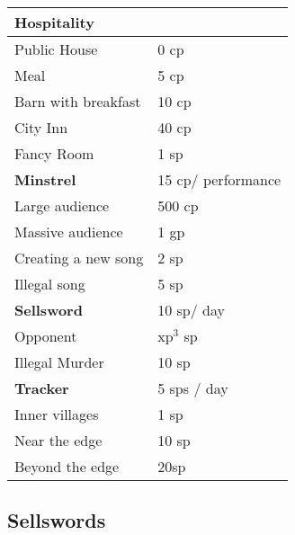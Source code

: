 \begin{multicols}{2}
\begin{tabularx}{\linewidth}{XX}
\end{tabularx}

\begin{tabularx}{\linewidth}{XX}
\hline
\textbf{Hospitality} &  \\\hline

Public House & 0 \gls{cp} \\

Meal & 5 \gls{cp} \\

Barn with breakfast & 10 \gls{cp} \\

City Inn & 40 \gls{cp} \\

Fancy Room & 1 \gls{sp} \\\hline

\textbf{Minstrel} &  15 \gls{cp}/ performance \\\hline

Large audience & 500 \gls{cp} \\

Massive audience & 1 \gls{gp} \\

Creating a new song & 2 \gls{sp} \\

Illegal song & 5 \gls{sp} \\\hline

\textbf{Sellsword} & 10 \gls{sp}/ day \\\hline

Opponent & \gls{xp}$^3$ \gls{sp} \\

Illegal Murder & 10 \gls{sp} \\\hline

\textbf{Tracker} &  5 \glspl{sp} / day \\\hline

  Inner villages & 1 \gls{sp} \\
  Near the \gls{edge} & 10 \gls{sp} \\
  Beyond the \gls{edge} & 20\gls{sp} \\
\hline

\end{tabularx}


\subsection{Sellswords}



\end{multicols}
